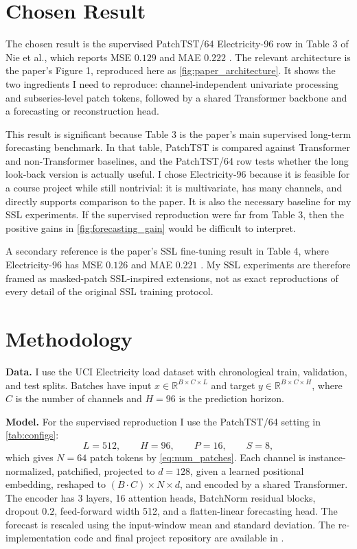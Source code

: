 \documentclass[11pt,twocolumn]{article}
\begin{document}
\section{Chosen Result}
The chosen result is the supervised PatchTST/64 Electricity-96 row in Table 3 of Nie et al., which reports MSE $0.129$ and MAE $0.222$ \cite{nie2023patchtst}. The relevant architecture is the paper's Figure 1, reproduced here as \autoref{fig:paper_architecture}. It shows the two ingredients I need to reproduce: channel-independent univariate processing and subseries-level patch tokens, followed by a shared Transformer backbone and a forecasting or reconstruction head.

This result is significant because Table 3 is the paper's main supervised long-term forecasting benchmark. In that table, PatchTST is compared against Transformer and non-Transformer baselines, and the PatchTST/64 row tests whether the long look-back version is actually useful. I chose Electricity-96 because it is feasible for a course project while still nontrivial: it is multivariate, has many channels, and directly supports comparison to the paper. It is also the necessary baseline for my SSL experiments. If the supervised reproduction were far from Table 3, then the positive gains in \autoref{fig:forecasting_gain} would be difficult to interpret.

A secondary reference is the paper's SSL fine-tuning result in Table 4, where Electricity-96 has MSE $0.126$ and MAE $0.221$ \cite{nie2023patchtst}. My SSL experiments are therefore framed as masked-patch SSL-inspired extensions, not as exact reproductions of every detail of the original SSL training protocol.

\section{Methodology}
\textbf{Data.} I use the UCI Electricity load dataset with chronological train, validation, and test splits. Batches have input $x\in\mathbb{R}^{B\times C\times L}$ and target $y\in\mathbb{R}^{B\times C\times H}$, where $C$ is the number of channels and $H=96$ is the prediction horizon.

\textbf{Model.} For the supervised reproduction I use the PatchTST/64 setting in \autoref{tab:configs}:
\[
L=512,\qquad H=96,\qquad P=16,\qquad S=8,
\]
which gives $N=64$ patch tokens by \eqref{eq:num_patches}. Each channel is instance-normalized, patchified, projected to $d=128$, given a learned positional embedding, reshaped to $(B\cdot C)\times N\times d$, and encoded by a shared Transformer. The encoder has 3 layers, 16 attention heads, BatchNorm residual blocks, dropout $0.2$, feed-forward width 512, and a flatten-linear forecasting head. The forecast is rescaled using the input-window mean and standard deviation. The re-implementation code and final project repository are available in \cite{Repo}.
\end{document}
